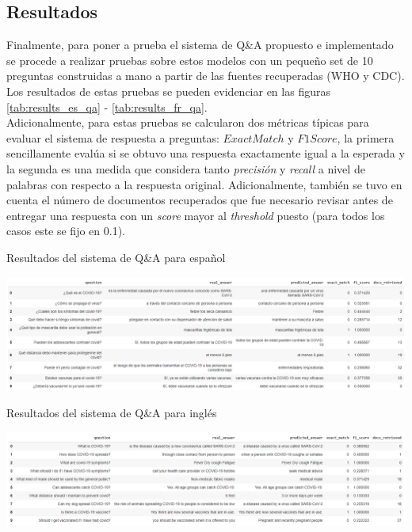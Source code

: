 \subsection{Resultados}

Finalmente, para poner a prueba el sistema de Q\&A propuesto e implementado se procede a realizar pruebas sobre estos modelos con un pequeño set de 10 preguntas construidas a mano a partir de las fuentes recuperadas (WHO y CDC). Los resultados de estas pruebas se pueden evidenciar en las figuras \ref{tab:results_es_qa} - \ref{tab:results_fr_qa}. \\

Adicionalmente, para estas pruebas se calcularon dos métricas típicas para evaluar el sistema de respuesta a preguntas: $Exact Match$ y $F1 Score$, la primera sencillamente evalúa si se obtuvo una respuesta exactamente igual a la esperada y la segunda es una medida que considera tanto \textit{precisión} y \textit{recall} a nivel de palabras con respecto a la respuesta original. Adicionalmente, también se tuvo en cuenta el número de documentos recuperados que fue necesario revisar antes de entregar una respuesta con un \textit{score} mayor al \textit{threshold} puesto (para todos los casos este se fijo en 0.1).

\begin{table}[H]
    \centering
    \caption{Resultados del sistema de Q\&A para español}
    \includegraphics[width=\textwidth]{doc_final/images/qa_es_results.PNG}
    \label{tab:results_en_qa}
\end{table}

\begin{table}[H]
    \centering
    \caption{Resultados del sistema de Q\&A para inglés}
    \includegraphics[width=\textwidth]{doc_final/images/qa_en_res.png}
    \label{tab:results_es_qa}
\end{table}

